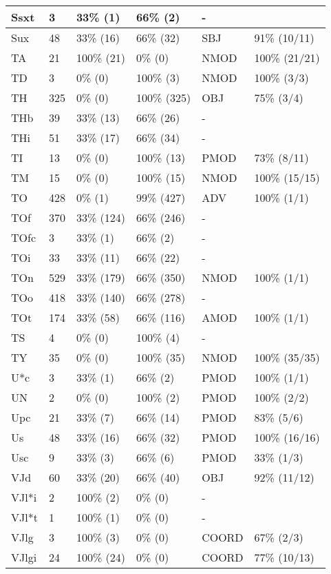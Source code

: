 \begin{figure*}
\begin{tabular}{|l|l|l|l||l|l|}
\hline
 Ssxt & 3 & 33\% (1) & 66\% (2) & - &  \\ 
\hline
 Sux & 48 & 33\% (16) & 66\% (32) & SBJ & 91\% (10/11) \\ 
\hline
 TA & 21 & 100\% (21) & 0\% (0) & NMOD & 100\% (21/21) \\ 
\hline
 TD & 3 & 0\% (0) & 100\% (3) & NMOD & 100\% (3/3) \\ 
\hline
 TH & 325 & 0\% (0) & 100\% (325) & OBJ & 75\% (3/4) \\ 
\hline
 THb & 39 & 33\% (13) & 66\% (26) & - &  \\ 
\hline
 THi & 51 & 33\% (17) & 66\% (34) & - &  \\ 
\hline
 TI & 13 & 0\% (0) & 100\% (13) & PMOD & 73\% (8/11) \\ 
\hline
 TM & 15 & 0\% (0) & 100\% (15) & NMOD & 100\% (15/15) \\ 
\hline
 TO & 428 & 0\% (1) & 99\% (427) & ADV & 100\% (1/1) \\ 
\hline
 TOf & 370 & 33\% (124) & 66\% (246) & - &  \\ 
\hline
 TOfc & 3 & 33\% (1) & 66\% (2) & - &  \\ 
\hline
 TOi & 33 & 33\% (11) & 66\% (22) & - &  \\ 
\hline
 TOn & 529 & 33\% (179) & 66\% (350) & NMOD & 100\% (1/1) \\ 
\hline
 TOo & 418 & 33\% (140) & 66\% (278) & - &  \\ 
\hline
 TOt & 174 & 33\% (58) & 66\% (116) & AMOD & 100\% (1/1) \\ 
\hline
 TS & 4 & 0\% (0) & 100\% (4) & - &  \\ 
\hline
 TY & 35 & 0\% (0) & 100\% (35) & NMOD & 100\% (35/35) \\ 
\hline
 U*c & 3 & 33\% (1) & 66\% (2) & PMOD & 100\% (1/1) \\ 
\hline
 UN & 2 & 0\% (0) & 100\% (2) & PMOD & 100\% (2/2) \\ 
\hline
 Upc & 21 & 33\% (7) & 66\% (14) & PMOD & 83\% (5/6) \\ 
\hline
 Us & 48 & 33\% (16) & 66\% (32) & PMOD & 100\% (16/16) \\ 
\hline
 Usc & 9 & 33\% (3) & 66\% (6) & PMOD & 33\% (1/3) \\ 
\hline
 VJd & 60 & 33\% (20) & 66\% (40) & OBJ & 92\% (11/12) \\ 
\hline
 VJl*i & 2 & 100\% (2) & 0\% (0) & - &  \\ 
\hline
 VJl*t & 1 & 100\% (1) & 0\% (0) & - &  \\ 
\hline
 VJlg & 3 & 100\% (3) & 0\% (0) & COORD & 67\% (2/3) \\ 
\hline
 VJlgi & 24 & 100\% (24) & 0\% (0) & COORD & 77\% (10/13) \\ 
\hline
\end{tabular}
\end{figure*}
